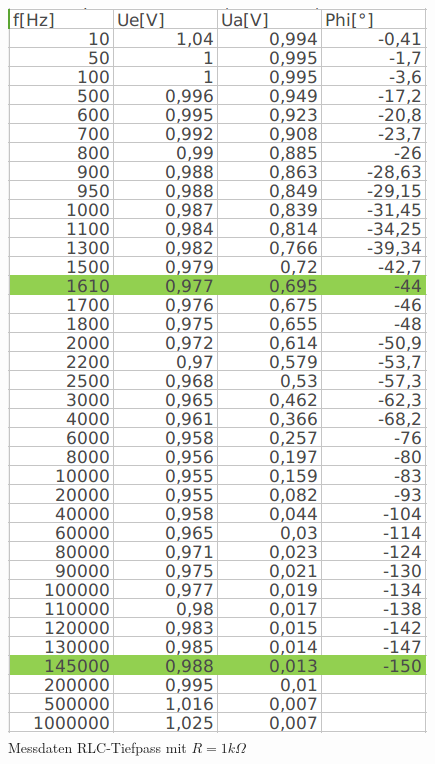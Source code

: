 \documentclass[12pt,a4paper,titlepage]{article}
\begin{document}
\begin{figure}[H]
\begin{minipage}[b]{0.3\textwidth}
    \includegraphics[width=\textwidth]{rlc_1k_data.png}
    \caption{Messdaten RLC-Tiefpass mit $R=1k\Omega$}
  \end{minipage}
\end{figure}
\end{document}
